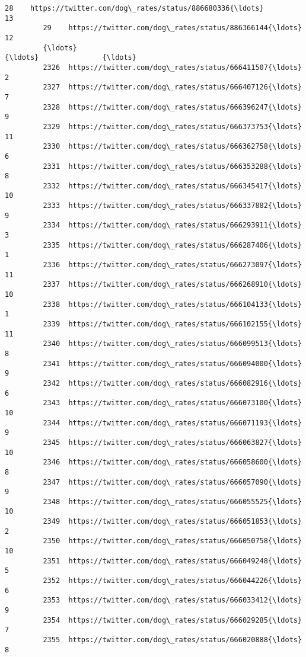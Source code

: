 \documentclass[11pt]{article}
\begin{document}
\begin{Verbatim}[commandchars=\\\{\}]
         28    https://twitter.com/dog\_rates/status/886680336{\ldots}                13   
         29    https://twitter.com/dog\_rates/status/886366144{\ldots}                12   
         {\ldots}                                                 {\ldots}               {\ldots}   
         2326  https://twitter.com/dog\_rates/status/666411507{\ldots}                 2   
         2327  https://twitter.com/dog\_rates/status/666407126{\ldots}                 7   
         2328  https://twitter.com/dog\_rates/status/666396247{\ldots}                 9   
         2329  https://twitter.com/dog\_rates/status/666373753{\ldots}                11   
         2330  https://twitter.com/dog\_rates/status/666362758{\ldots}                 6   
         2331  https://twitter.com/dog\_rates/status/666353288{\ldots}                 8   
         2332  https://twitter.com/dog\_rates/status/666345417{\ldots}                10   
         2333  https://twitter.com/dog\_rates/status/666337882{\ldots}                 9   
         2334  https://twitter.com/dog\_rates/status/666293911{\ldots}                 3   
         2335  https://twitter.com/dog\_rates/status/666287406{\ldots}                 1   
         2336  https://twitter.com/dog\_rates/status/666273097{\ldots}                11   
         2337  https://twitter.com/dog\_rates/status/666268910{\ldots}                10   
         2338  https://twitter.com/dog\_rates/status/666104133{\ldots}                 1   
         2339  https://twitter.com/dog\_rates/status/666102155{\ldots}                11   
         2340  https://twitter.com/dog\_rates/status/666099513{\ldots}                 8   
         2341  https://twitter.com/dog\_rates/status/666094000{\ldots}                 9   
         2342  https://twitter.com/dog\_rates/status/666082916{\ldots}                 6   
         2343  https://twitter.com/dog\_rates/status/666073100{\ldots}                10   
         2344  https://twitter.com/dog\_rates/status/666071193{\ldots}                 9   
         2345  https://twitter.com/dog\_rates/status/666063827{\ldots}                10   
         2346  https://twitter.com/dog\_rates/status/666058600{\ldots}                 8   
         2347  https://twitter.com/dog\_rates/status/666057090{\ldots}                 9   
         2348  https://twitter.com/dog\_rates/status/666055525{\ldots}                10   
         2349  https://twitter.com/dog\_rates/status/666051853{\ldots}                 2   
         2350  https://twitter.com/dog\_rates/status/666050758{\ldots}                10   
         2351  https://twitter.com/dog\_rates/status/666049248{\ldots}                 5   
         2352  https://twitter.com/dog\_rates/status/666044226{\ldots}                 6   
         2353  https://twitter.com/dog\_rates/status/666033412{\ldots}                 9   
         2354  https://twitter.com/dog\_rates/status/666029285{\ldots}                 7   
         2355  https://twitter.com/dog\_rates/status/666020888{\ldots}                 8   
         

\end{Verbatim}
\end{document}
